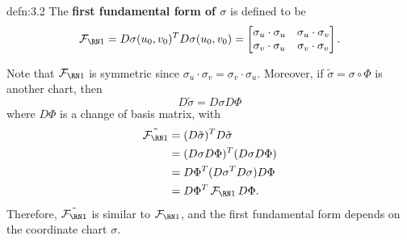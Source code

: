 \begin{defn}{defn:3.2}
    The {\bf first fundamental form of $\sigma$} is defined to be 
    \[ \FFF = D\sigma(u_0, v_0)^T D\sigma(u_0, v_0) 
    = \begin{bmatrix} 
        \sigma_u \cdot \sigma_u & \sigma_u \cdot \sigma_v \\ 
        \sigma_v \cdot \sigma_u & \sigma_v \cdot \sigma_v 
    \end{bmatrix}. \] 
\end{defn}\vspace{-0.25cm}

Note that $\FFF$ is symmetric since $\sigma_u \cdot \sigma_v = \sigma_v 
\cdot \sigma_u$. Moreover, if $\tilde\sigma = \sigma \circ \Phi$ is another 
chart, then 
\[ D\tilde\sigma = D\sigma D\Phi \] 
where $D\Phi$ is a change of basis matrix, with 
\begin{align*}
    \tilde{\FFF} &= (D\tilde\sigma)^T D\tilde\sigma \\ 
    &= (D\sigma D\Phi)^T (D\sigma D\Phi) \\ 
    &= D\Phi^T (D\sigma^T D\sigma) D\Phi \\ 
    &= D\Phi^T \FFF D\Phi.
\end{align*}
Therefore, $\tilde{\FFF}$ is similar to $\FFF$, and the first fundamental 
form depends on the coordinate chart $\sigma$. 

